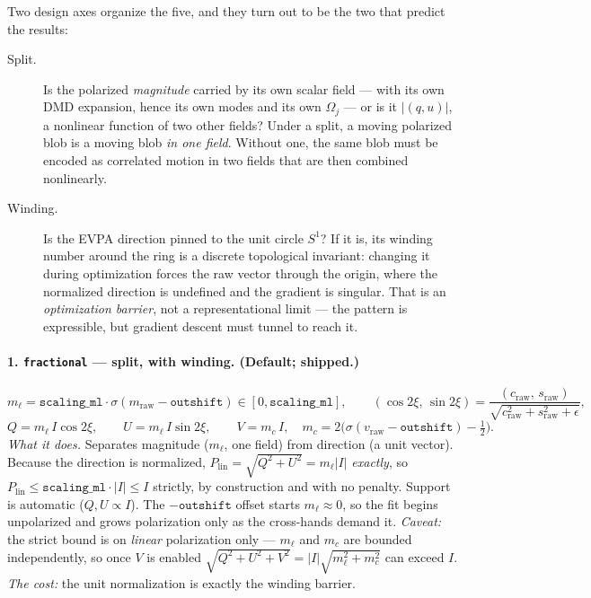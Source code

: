 \documentclass[11pt]{article}
\begin{document}
Two design axes organize the five, and they turn out to be the two that predict the
results:

\begin{description}
  \item[Split.] Is the polarized \emph{magnitude} carried by its own scalar field --- with
  its own DMD expansion, hence its own modes and its own $\Omega_j$ --- or is it
  $|(q,u)|$, a nonlinear function of two other fields? Under a split, a moving polarized
  blob is a moving blob \emph{in one field}. Without one, the same blob must be encoded as
  correlated motion in two fields that are then combined nonlinearly.
  \item[Winding.] Is the EVPA direction pinned to the unit circle $S^1$? If it is, its
  winding number around the ring is a discrete topological invariant: changing it during
  optimization forces the raw vector through the origin, where the normalized direction is
  undefined and the gradient is singular. That is an \emph{optimization barrier}, not a
  representational limit --- the pattern is expressible, but gradient descent must tunnel
  to reach it.
\end{description}

\paragraph{1. \texttt{fractional} --- split, with winding. (Default; shipped.)}
\begin{equation}
  m_\ell = \texttt{scaling\_ml}\cdot\sigma(m_{\mathrm{raw}}-\texttt{outshift})
  \in [0,\texttt{scaling\_ml}],
  \qquad
  (\cos2\xi,\,\sin2\xi) = \frac{(c_{\mathrm{raw}},\,s_{\mathrm{raw}})}
       {\sqrt{c_{\mathrm{raw}}^{2}+s_{\mathrm{raw}}^{2}+\epsilon}},
\end{equation}
\begin{equation}
  Q = m_\ell\,I\cos2\xi,\qquad U = m_\ell\,I\sin2\xi,\qquad
  V = m_c\,I,\quad m_c = 2\big(\sigma(v_{\mathrm{raw}}-\texttt{outshift})-\tfrac12\big).
\end{equation}
\emph{What it does.} Separates magnitude ($m_\ell$, one field) from direction (a unit
vector). Because the direction is normalized, $P_{\mathrm{lin}}=\sqrt{Q^2+U^2}=m_\ell|I|$
\emph{exactly}, so $P_{\mathrm{lin}}\le\texttt{scaling\_ml}\cdot|I|\le I$ strictly, by
construction and with no penalty. Support is automatic ($Q,U\propto I$). The
$-\texttt{outshift}$ offset starts $m_\ell\approx0$, so the fit begins unpolarized and
grows polarization only as the cross-hands demand it. \emph{Caveat:} the strict bound is
on \emph{linear} polarization only --- $m_\ell$ and $m_c$ are bounded independently, so
once $V$ is enabled $\sqrt{Q^2+U^2+V^2}=|I|\sqrt{m_\ell^2+m_c^2}$ can exceed $I$. \emph{The
cost:} the unit normalization is exactly the winding barrier.
\end{document}
